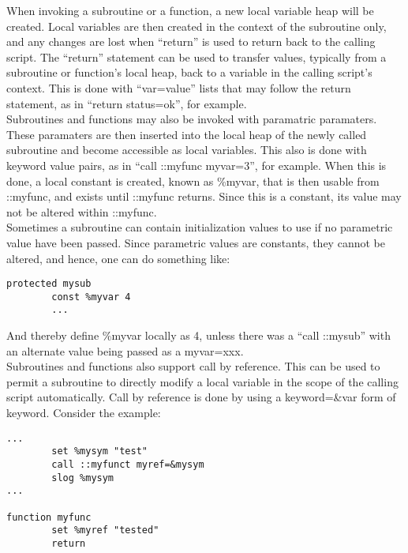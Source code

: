 \documentclass[a4paper,12pt]{article}
\begin{document}
When invoking a subroutine or a function, a new local variable heap will
be created.  Local variables are then created in the context of the
subroutine only, and any changes are lost when ``return'' is used to
return back to the calling script.  The ``return'' statement can be used
to transfer values, typically from a subroutine or function's local
heap, back to a variable in the calling script's context.  This is done
with ``var=value'' lists that may follow the return statement, as in
``return status=ok'', for example. \\

Subroutines and functions may also be invoked with paramatric
paramaters.  These paramaters are then inserted into the local heap of
the newly called subroutine and become accessible as local variables. 
This also is done with keyword value pairs, as in ``call ::myfunc
myvar=3'', for example.  When this is done, a local constant is created,
known as \%myvar, that is then usable from ::myfunc, and exists until
::myfunc returns.  Since this is a constant, its value may not be
altered within ::myfunc. \\

Sometimes a subroutine can contain initialization values to use if no
parametric value have been passed.  Since parametric values are constants,
they cannot be altered, and hence, one can do something like: \\

\begin{verbatim}
protected mysub
        const %myvar 4
        ...
\end{verbatim}

And thereby define \%myvar locally as 4, unless there was a ``call 
::mysub'' with an alternate value being passed as a myvar=xxx. \\

Subroutines and functions also support call by reference.  This can be
used to permit a subroutine to directly modify a local variable in the
scope of the calling script automatically.  Call by reference is done by
using a keyword=\&var form of keyword.  Consider the example: \\

\begin{verbatim}
...
        set %mysym "test"
        call ::myfunct myref=&mysym
        slog %mysym
...

function myfunc
        set %myref "tested"
        return

\end{verbatim}
\end{document}
